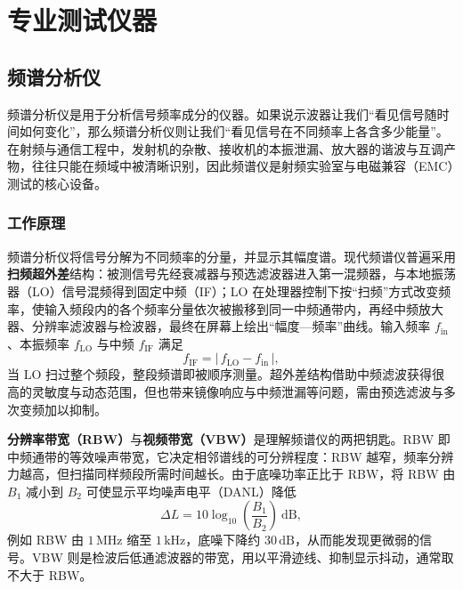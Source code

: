 
\chapter{专业测试仪器}
\label{chap:specialized_instruments}

\section{频谱分析仪}
\label{sec:spectrum_analyzer}

频谱分析仪是用于分析信号频率成分的仪器。如果说示波器让我们“看见信号随时间如何变化”，那么频谱分析仪则让我们“看见信号在不同频率上各含多少能量”。在射频与通信工程中，发射机的杂散、接收机的本振泄漏、放大器的谐波与互调产物，往往只能在频域中被清晰识别，因此频谱仪是射频实验室与电磁兼容（EMC）测试的核心设备。

\subsection{工作原理}

频谱分析仪将信号分解为不同频率的分量，并显示其幅度谱。现代频谱仪普遍采用\textbf{扫频超外差}结构：被测信号先经衰减器与预选滤波器进入第一混频器，与本地振荡器（LO）信号混频得到固定中频（IF）；LO 在处理器控制下按“扫频”方式改变频率，使输入频段内的各个频率分量依次被搬移到同一中频通带内，再经中频放大器、分辨率滤波器与检波器，最终在屏幕上绘出“幅度—频率”曲线。输入频率 $f_{\mathrm{in}}$、本振频率 $f_{\mathrm{LO}}$ 与中频 $f_{\mathrm{IF}}$ 满足
\[
    f_{\mathrm{IF}} = |\, f_{\mathrm{LO}} - f_{\mathrm{in}} \,| ,
\]
当 LO 扫过整个频段，整段频谱即被顺序测量。超外差结构借助中频滤波获得很高的灵敏度与动态范围，但也带来镜像响应与中频泄漏等问题，需由预选滤波与多次变频加以抑制。

\textbf{分辨率带宽（RBW）}与\textbf{视频带宽（VBW）}是理解频谱仪的两把钥匙。RBW 即中频通带的等效噪声带宽，它决定相邻谱线的可分辨程度：RBW 越窄，频率分辨力越高，但扫描同样频段所需时间越长。由于底噪功率正比于 RBW，将 RBW 由 $B_1$ 减小到 $B_2$ 可使显示平均噪声电平（DANL）降低
\[
    \Delta L = 10\log_{10}\!\left(\frac{B_1}{B_2}\right)\ \mathrm{dB} ,
\]
例如 RBW 由 $1\,\mathrm{MHz}$ 缩至 $1\,\mathrm{kHz}$，底噪下降约 $30\,\mathrm{dB}$，从而能发现更微弱的信号。VBW 则是检波后低通滤波器的带宽，用以平滑迹线、抑制显示抖动，通常取不大于 RBW。


